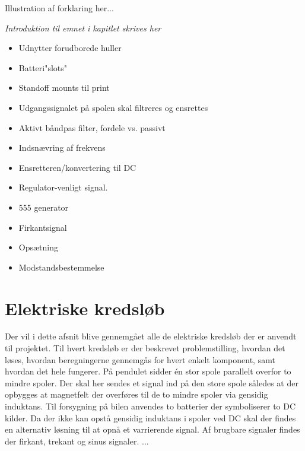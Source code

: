 Illustration af forklaring her...

\emph{Introduktion til emnet i kapitlet skrives her}
\begin {itemize}
\item Udnytter forudborede huller
\item Batteri"slots"
\item Standoff mounts til print

\item Udgangssignalet på spolen skal filtreres og ensrettes
\item Aktivt båndpas filter, fordele vs. passivt
\item Indsnævring af frekvens
\item Ensretteren/konvertering til DC
\item Regulator-venligt signal. 

\item 555 generator
\item Firkantsignal
\item Opsætning 
\item Modstandsbestemmelse
\end {itemize}

\section{Elektriske kredsløb}\label{sec:sec_sparningsreg}
Der vil i dette afsnit blive gennemgået alle de elektriske kredsløb der er anvendt til projektet. Til hvert kredsløb er der beskrevet problemstilling, hvordan det løses, hvordan beregningerne gennemgås for hvert enkelt komponent, samt hvordan det hele fungerer.
På pendulet sidder én stor spole parallelt overfor to mindre spoler. Der skal her sendes et signal ind på den store spole således at der opbygges at magnetfelt der overføres til de to mindre spoler via gensidig induktans. Til forsygning på bilen anvendes to batterier der symboliserer to DC kilder. Da der ikke kan opstå gensidig induktans i spoler ved DC skal der findes en alternativ løsning til at opnå et varrierende signal. Af brugbare signaler findes der firkant, trekant og sinus signaler.
...
